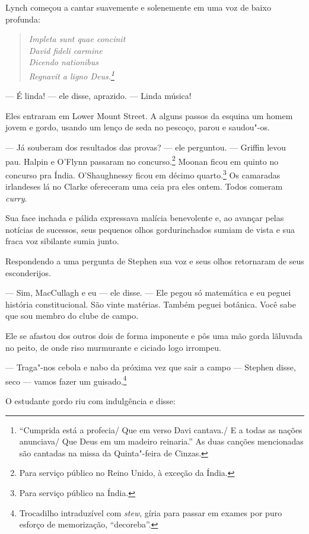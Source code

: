 Lynch começou a cantar suavemente e solenemente em uma voz de baixo
profunda:

\begin{verse}\itshape
Impleta sunt quae concinit\\
David fideli carmine\\
Dicendo nationibus\\
Regnavit a ligno Deus.\footnote{ ``Cumprida está a profecia/ Que
em verso Davi cantava./ E a todas as nações anunciava/ Que Deus
em um madeiro reinaria.'' As duas canções mencionadas são cantadas na
missa da Quinta"-feira de Cinzas.}                                 
\end{verse}

 --- É linda! --- ele disse, aprazido. --- Linda música!

Eles entraram em Lower Mount Street. A alguns passos da esquina um homem
jovem e gordo, usando um lenço de seda no pescoço, parou e saudou"-os.

 --- Já souberam dos resultados das provas? --- ele perguntou. --- Griffin levou
pau. Halpin e O’Flynn passaram no concurso.\footnote{ Para serviço público no Reino Unido, à exceção da Índia.} 
Moonan ficou em quinto no concurso pra Índia. O’Shaughnessy ficou
em décimo quarto.\footnote{ Para serviço público na Índia.} Os
camaradas irlandeses lá no Clarke ofereceram uma ceia pra eles ontem.
Todos comeram \textit{curry}.

Sua face inchada e pálida expressava malícia benevolente e, ao avançar
pelas notícias de sucessos, seus pequenos olhos gordurinchados sumiam 
de vista e sua fraca voz sibilante sumia junto.

Respondendo a uma pergunta de Stephen sua voz e seus olhos retornaram de
seus esconderijos.

 --- Sim, MacCullagh e eu --- ele disse. --- Ele pegou só matemática e eu peguei
história constitucional. São vinte matérias. Também peguei botânica.
Você sabe que sou membro do clube de campo.

Ele se afastou dos outros dois de forma imponente e pôs uma mão gorda
lãluvada no peito, de onde riso murmurante e ciciado logo irrompeu.  

 --- Traga"-nos cebola e nabo da próxima vez que sair a campo --- Stephen disse,
seco --- vamos fazer um guisado.\footnote{ Trocadilho intraduzível com
\textit{stew}, gíria para passar em exames por puro esforço de memorização,
“decoreba”.} 

O estudante gordo riu com indulgência e disse:

